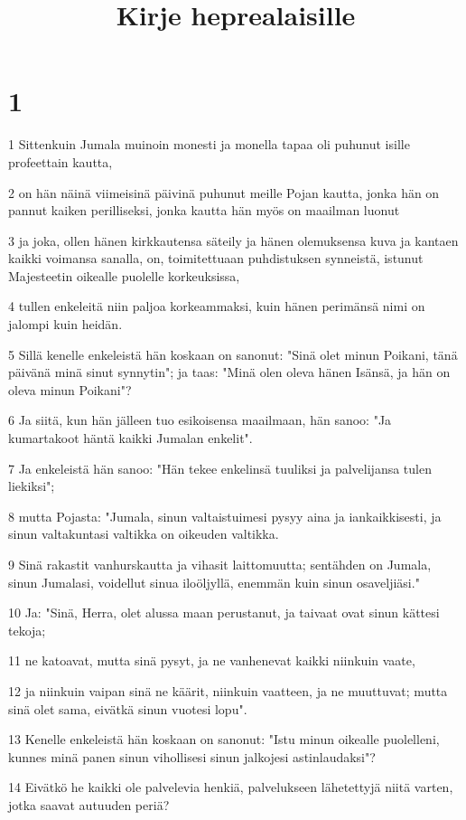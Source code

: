 

\title{Kirje heprealaisille}


\chapter{1}

\par 1 Sittenkuin Jumala muinoin monesti ja monella tapaa oli puhunut isille profeettain kautta,
\par 2 on hän näinä viimeisinä päivinä puhunut meille Pojan kautta, jonka hän on pannut kaiken perilliseksi, jonka kautta hän myös on maailman luonut
\par 3 ja joka, ollen hänen kirkkautensa säteily ja hänen olemuksensa kuva ja kantaen kaikki voimansa sanalla, on, toimitettuaan puhdistuksen synneistä, istunut Majesteetin oikealle puolelle korkeuksissa,
\par 4 tullen enkeleitä niin paljoa korkeammaksi, kuin hänen perimänsä nimi on jalompi kuin heidän.
\par 5 Sillä kenelle enkeleistä hän koskaan on sanonut: "Sinä olet minun Poikani, tänä päivänä minä sinut synnytin"; ja taas: "Minä olen oleva hänen Isänsä, ja hän on oleva minun Poikani"?
\par 6 Ja siitä, kun hän jälleen tuo esikoisensa maailmaan, hän sanoo: "Ja kumartakoot häntä kaikki Jumalan enkelit".
\par 7 Ja enkeleistä hän sanoo: "Hän tekee enkelinsä tuuliksi ja palvelijansa tulen liekiksi";
\par 8 mutta Pojasta: "Jumala, sinun valtaistuimesi pysyy aina ja iankaikkisesti, ja sinun valtakuntasi valtikka on oikeuden valtikka.
\par 9 Sinä rakastit vanhurskautta ja vihasit laittomuutta; sentähden on Jumala, sinun Jumalasi, voidellut sinua iloöljyllä, enemmän kuin sinun osaveljiäsi."
\par 10 Ja: "Sinä, Herra, olet alussa maan perustanut, ja taivaat ovat sinun kättesi tekoja;
\par 11 ne katoavat, mutta sinä pysyt, ja ne vanhenevat kaikki niinkuin vaate,
\par 12 ja niinkuin vaipan sinä ne käärit, niinkuin vaatteen, ja ne muuttuvat; mutta sinä olet sama, eivätkä sinun vuotesi lopu".
\par 13 Kenelle enkeleistä hän koskaan on sanonut: "Istu minun oikealle puolelleni, kunnes minä panen sinun vihollisesi sinun jalkojesi astinlaudaksi"?
\par 14 Eivätkö he kaikki ole palvelevia henkiä, palvelukseen lähetettyjä niitä varten, jotka saavat autuuden periä?

